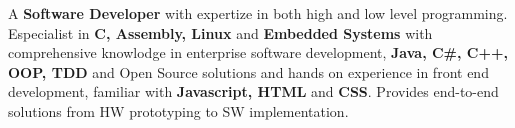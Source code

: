 \nohyphens{\justify
A \textbf{Software Developer} with expertize in both high and low level programming. Especialist in \textbf{C, Assembly, Linux} and \textbf{Embedded Systems}
with comprehensive knowlodge in
enterprise software development, \textbf{Java, C#, C++, OOP, TDD} and Open Source solutions and hands on experience in front end development,
familiar with \textbf{Javascript, HTML} and \textbf{CSS}. Provides end-to-end solutions from HW prototyping to SW implementation.
}
